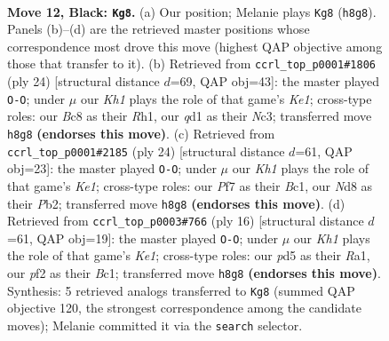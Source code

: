 \documentclass[11pt]{article}
\begin{document}
\clearpage

\begin{figure}[p]\centering
\begin{subfigure}{0.46\textwidth}\centering
\resizebox{\linewidth}{!}{%
\newchessgame
\chessboard[
  setfen={r1bn1r1k/1pppqppp/p4n2/3P4/8/2B1PNP1/PP3PBP/R2Q1RK1 b - - 0 12},
  showmover=false,
  pgfstyle=straightmove, color=movearrow, markmove={h8-g8}
]}
\caption{}
\end{subfigure}\hfill
\begin{subfigure}{0.46\textwidth}\centering
\resizebox{\linewidth}{!}{%
\newchessgame
\chessboard[
  setfen={r2q1rk1/ppp2pbp/3p1np1/3P4/3QP3/2N2B1P/PPP2PP1/R3K2R w KQ - 1 13},
  showmover=false,
  pgfstyle=straightmove, color=movearrow, markmove={e1-g1}
]}
\caption{}
\end{subfigure}
\\[4pt]
\begin{subfigure}{0.46\textwidth}\centering
\resizebox{\linewidth}{!}{%
\newchessgame
\chessboard[
  setfen={r2q1rk1/1p2bpp1/p2pbn1p/4p3/P3P3/2NQN3/1PP2PPP/R1B1K2R w KQ - 1 13},
  showmover=false,
  pgfstyle=straightmove, color=movearrow, markmove={e1-g1}
]}
\caption{}
\end{subfigure}\hfill
\begin{subfigure}{0.46\textwidth}\centering
\resizebox{\linewidth}{!}{%
\newchessgame
\chessboard[
  setfen={rn1q1rk1/pp2ppbp/2p1bnp1/8/2NP4/3Q1NP1/PP2PPBP/R1B1K2R w KQ - 5 9},
  showmover=false,
  pgfstyle=straightmove, color=movearrow, markmove={e1-g1}
]}
\caption{}
\end{subfigure}
\caption{\textbf{Move 12, Black: \texttt{Kg8}.} (a) Our position; Melanie plays \texttt{Kg8} (\texttt{h8g8}). Panels (b)--(d) are the retrieved master positions whose correspondence most drove this move (highest QAP objective among those that transfer to it). (b) Retrieved from \texttt{ccrl\_top\_p0001\#1806} (ply 24) [structural distance $d$=69, QAP obj=43]: the master played \texttt{O-O}; under $\mu$ our \emph{Kh1} plays the role of that game's \emph{Ke1}; cross-type roles: our \emph{B}c8 as their \emph{R}h1, our \emph{q}d1 as their \emph{N}c3; transferred move \texttt{h8g8} \textbf{(endorses this move)}. (c) Retrieved from \texttt{ccrl\_top\_p0001\#2185} (ply 24) [structural distance $d$=61, QAP obj=23]: the master played \texttt{O-O}; under $\mu$ our \emph{Kh1} plays the role of that game's \emph{Ke1}; cross-type roles: our \emph{P}f7 as their \emph{B}c1, our \emph{N}d8 as their \emph{P}b2; transferred move \texttt{h8g8} \textbf{(endorses this move)}. (d) Retrieved from \texttt{ccrl\_top\_p0003\#766} (ply 16) [structural distance $d$=61, QAP obj=19]: the master played \texttt{O-O}; under $\mu$ our \emph{Kh1} plays the role of that game's \emph{Ke1}; cross-type roles: our \emph{p}d5 as their \emph{R}a1, our \emph{p}f2 as their \emph{B}c1; transferred move \texttt{h8g8} \textbf{(endorses this move)}. Synthesis: 5 retrieved analogs transferred to \texttt{Kg8} (summed QAP objective 120, the strongest correspondence among the candidate moves); Melanie committed it via the \texttt{search} selector.}
\label{fig:thought-m23}
\end{figure}
\end{document}
